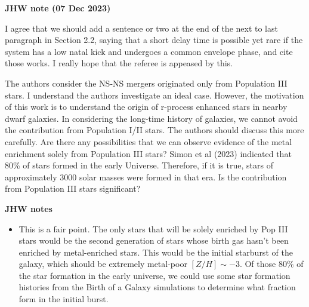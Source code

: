 \documentclass[11pt]{article}
\begin{document}
\noindent\textbf{JHW note (07 Dec 2023)}

I agree that we should add a sentence or two at the end of the next to last paragraph in Section 2.2, saying that a short delay time is possible yet rare if the system has a low natal kick and undergoes a common envelope phase, and cite those works.  I really hope that the referee is appeased by this.

\begin{tcolorbox}[colback={lightgray}]   
    The authors consider the NS-NS mergers originated only from Population III stars. I understand the authors investigate an ideal case. However, the motivation of this work is to understand the origin of r-process enhanced stars in nearby dwarf galaxies. In considering the long-time history of galaxies, we cannot avoid the contribution from Population I/II stars. The authors should discuss this more carefully. Are there any possibilities that we can observe evidence of the metal enrichment solely from Population III stars? Simon et al (2023) indicated that 80\% of stars formed in the early Universe. Therefore, if it is true, stars of approximately 3000 solar masses were formed in that era. Is the contribution from Population III stars significant?
\end{tcolorbox}

\noindent\textbf{JHW notes}
\begin{itemize}
  \item This is a fair point.  The only stars that will be solely enriched by Pop III stars would be the second generation of stars whose birth gas hasn't been enriched by metal-enriched stars.  This would be the initial starburst of the galaxy, which should be extremely metal-poor $[Z/H] \sim -3$.  Of those 80\% of the star formation in the early universe, we could use some star formation histories from the Birth of a Galaxy simulations to determine what fraction form in the initial burst.
\end{itemize}
\end{document}
